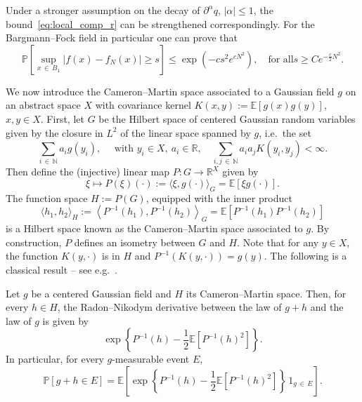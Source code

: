 \documentclass[AHL,Unicode,longabstracts,published]{cedram}
\renewcommand{\P}{\mathbb{P}}
\newcommand{\E}{\mathbb{E}}
\newcommand{\R}{\mathbb{R}}
\newcommand{\N}{\mathbb{N}}
\newcommand{\R}{\mathbb{R}}
\begin{document}
\begin{rema}
Under a stronger assumption on the decay of $\partial^\alpha q$, $|\alpha|\leq1$, the bound~\eqref{eq:local_comp_r} can be strengthened correspondingly. For the Bargmann--Fock field in particular one can prove that
\begin{equation}\label{eq:local_comp_r2}
\P\left[\sup_{x\,\in\,B_1}\left|f(x)-f_N(x)\right| \geq s \right] \leq \exp\left(-cs^2 e^{cN^2}\right), \quad\text{for all} s\geq Ce^{-\frac{c}{2}N^2}.
\end{equation}
\end{rema}

We now introduce the Cameron--Martin space associated to a Gaussian field $g$ on an abstract space $X$ with covariance kernel $K(x,y):=\E[g(x)g(y)]$, $x,y\in X$. First, let $G$ be the Hilbert space of centered Gaussian random variables given by the closure in $L^2$ of the linear space spanned by $g$, i.e.~the set
\begin{equation}
\sum_{i\,\in\,\N}a_i g(y_i),\quad\text{ with } y_i\in X,~a_i\in \R,\quad\sum_{i,j\,\in\,\N}a_i a_j K(y_i,y_j)<\infty.
\end{equation}
Then define the (injective) linear map $P: G\to \R^X$ given by
\begin{equation}
\xi \mapsto P(\xi)(\cdot):=\langle\xi,g(\cdot)\rangle_G=\E[\xi g(\cdot)].
\end{equation}
The function space $H:=P(G)$, equipped with the inner product
\begin{equation}
\langle h_1,h_2\rangle_H:=\left\langle P^{-1}(h_1),P^{-1}(h_2)\right\rangle_G=\E\left[P^{-1}(h_1)P^{-1}(h_2)\right]
\end{equation}
is a Hilbert space known as the Cameron--Martin space associated to $g$. By construction, $P$ defines an isometry between $G$ and $H$. Note that for any $y\in X$, the function $K(y,\cdot)$ is in $H$ and $P^{-1}(K(y,\cdot))=g(y)$. The following is a classical result -- see e.g.~\cite[Theorems~14.1 and~3.33]{janson_1997}.

\begin{theo}\label{thm:Cameron-Martin}
Let $g$ be a centered Gaussian field and $H$ its Cameron--Martin space. Then, for every $h\in H$, the Radon--Nikodym derivative between the law of $g+h$ and the law of $g$ is given by
\begin{equation}
\exp\left\{P^{-1}(h) - \frac{1}{2}\E\left[P^{-1}(h)^2\right]\right\}.
\end{equation}
In particular, for every $g$-measurable event $E$,
\begin{equation}
\P\left[g+h\in E\right]=\E\left[\exp\left\{P^{-1}(h) - \frac{1}{2}\E\left[P^{-1}(h)^2\right]\right\} \,1_{g\,\in\,E}\right].
\end{equation}
\end{theo}
\end{document}
